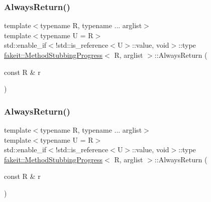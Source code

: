 \mbox{\label{structfakeit_1_1MethodStubbingProgress_a268ca122b518c0a34e80535d8f457549}} 
\subsubsection{\texorpdfstring{AlwaysReturn()}{AlwaysReturn()}\hspace{0.1cm}{\footnotesize\ttfamily [15/27]}}
{\footnotesize\ttfamily template$<$typename R, typename ... arglist$>$ \\
template$<$typename U  = R$>$ \\
std\+::enable\+\_\+if$<$!std\+::is\+\_\+reference$<$U$>$\+::value, void$>$\+::type \mbox{\hyperlink{structfakeit_1_1MethodStubbingProgress}{fakeit\+::\+Method\+Stubbing\+Progress}}$<$ R, arglist $>$\+::Always\+Return (\begin{DoxyParamCaption}\item[{const R \&}]{r }\end{DoxyParamCaption})\hspace{0.3cm}{\ttfamily [inline]}}

\mbox{\label{structfakeit_1_1MethodStubbingProgress_a268ca122b518c0a34e80535d8f457549}} 
\subsubsection{\texorpdfstring{AlwaysReturn()}{AlwaysReturn()}\hspace{0.1cm}{\footnotesize\ttfamily [16/27]}}
{\footnotesize\ttfamily template$<$typename R, typename ... arglist$>$ \\
template$<$typename U  = R$>$ \\
std\+::enable\+\_\+if$<$!std\+::is\+\_\+reference$<$U$>$\+::value, void$>$\+::type \mbox{\hyperlink{structfakeit_1_1MethodStubbingProgress}{fakeit\+::\+Method\+Stubbing\+Progress}}$<$ R, arglist $>$\+::Always\+Return (\begin{DoxyParamCaption}\item[{const R \&}]{r }\end{DoxyParamCaption})\hspace{0.3cm}{\ttfamily [inline]}}

